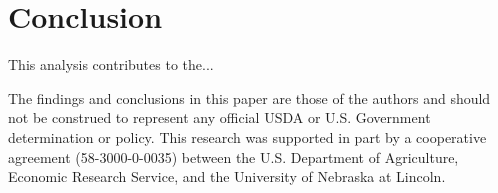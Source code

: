 \documentclass{ejb}
\begin{document}
\section{Conclusion}
\label{conclusion}

This analysis contributes to the...\\

\singlespacing
\begin{acknowledgements}
	The findings and conclusions in this paper are
	those of the authors and should not be construed to represent any
	official USDA or U.S. Government determination or policy. This
	research was supported in part by a cooperative agreement
	(58-3000-0-0035) between the U.S. Department of Agriculture,
	Economic Research Service, and the University of Nebraska at Lincoln.
\end{acknowledgements}

\newpage


\end{document}
